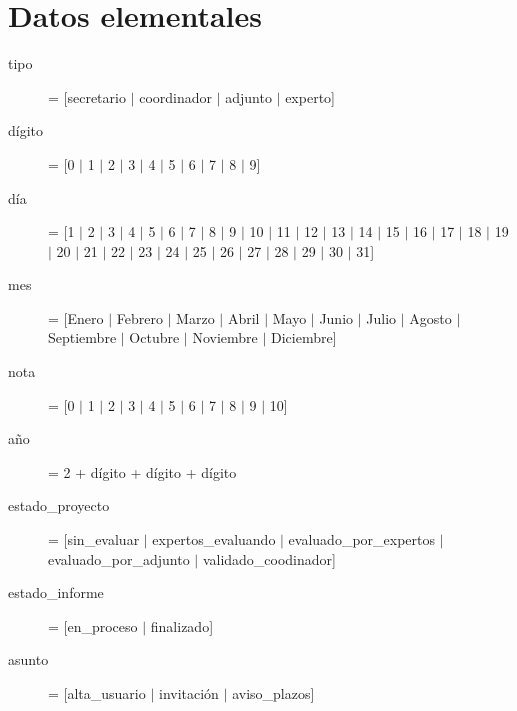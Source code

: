 \documentclass[12pt,a4paper,titlepage,spanish,twoside]{book}
\begin{document}
\section{Datos elementales}
\begin{description}
\item[tipo] = [secretario $\mid$ coordinador $\mid$ adjunto $\mid$ experto]

\item[dígito] = [0 $\mid$ 1 $\mid$ 2 $\mid$ 3 $\mid$ 4 $\mid$ 5 $\mid$ 6
  $\mid$ 7 $\mid$ 8 $\mid$ 9] 

\item[día] = [1 $\mid$ 2 $\mid$ 3 $\mid$ 4 $\mid$ 5 $\mid$ 6 $\mid$ 7 $\mid$
  8 $\mid$ 9 $\mid$ 10 $\mid$ 11 $\mid$ 12 $\mid$ 13 $\mid$ 14 $\mid$ 15
  $\mid$ 16 $\mid$ 17 $\mid$ 18 $\mid$ 19 $\mid$ 20 $\mid$ 21 $\mid$ 22
  $\mid$ 23 $\mid$ 24 $\mid$ 25 $\mid$ 26 $\mid$ 27 $\mid$ 28 $\mid$ 29
  $\mid$ 30 $\mid$ 31] 

\item[mes] = [Enero $\mid$ Febrero $\mid$ Marzo $\mid$ Abril $\mid$ Mayo
  $\mid$ Junio $\mid$ Julio $\mid$ Agosto $\mid$ Septiembre $\mid$ Octubre
  $\mid$ Noviembre $\mid$ Diciembre] 

\item[nota] = [0 $\mid$ 1 $\mid$ 2 $\mid$ 3 $\mid$ 4 $\mid$ 5 $\mid$ 6 $\mid$
  7 $\mid$ 8 $\mid$ 9 $\mid$ 10] 

\item[año] = 2 + dígito + dígito + dígito

\item[estado\_proyecto] = [sin\_evaluar $\mid$ expertos\_evaluando $\mid$
  evaluado\_por\_expertos $\mid$ evaluado\_por\_adjunto $\mid$
  validado\_coodinador] 

\item[estado\_informe] = [en\_proceso $\mid$ finalizado]

\item[asunto] = [alta\_usuario $\mid$ invitación $\mid$ aviso\_plazos]
\end{description}
\end{document}
